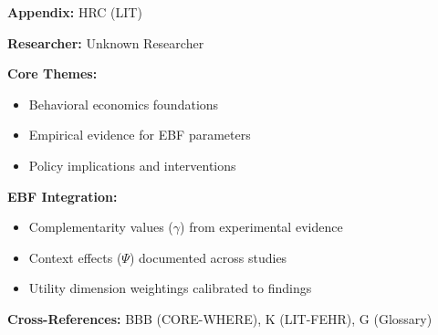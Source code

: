 \begin{tcolorbox}[colback=blue!5!white, colframe=blue!75!black,
    title=Quick Reference: Unknown Researcher Research]

\textbf{Appendix:} HRC (LIT)

\textbf{Researcher:} Unknown Researcher

\textbf{Core Themes:}
\begin{itemize}[nosep]
\item Behavioral economics foundations
\item Empirical evidence for EBF parameters
\item Policy implications and interventions
\end{itemize}

\textbf{EBF Integration:}
\begin{itemize}[nosep]
\item Complementarity values ($\gamma$) from experimental evidence
\item Context effects ($\Psi$) documented across studies
\item Utility dimension weightings calibrated to findings
\end{itemize}

\textbf{Cross-References:} BBB (CORE-WHERE), K (LIT-FEHR), G (Glossary)
\end{tcolorbox}



